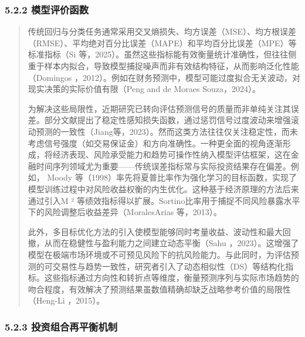 \documentclass[UTF8]{ctexart}
\begin{document}
\subsubsection{5.2.2
模型评价函数}\label{ux6a21ux578bux8bc4ux4ef7ux51fdux6570}

\begin{quote}
传统回归与分类任务通常采用交叉熵损失、均方误差（MSE）、均方根误差（RMSE）、平均绝对百分比误差（MAPE）和平均百分比误差（MPE）等标准指标（Si
等，2025）。虽然这些指标能有效衡量统计准确性，但往往侧重于样本内拟合，导致模型捕捉噪声而非有效结构特征，从而影响泛化性能（Domingos
，2012）。例如在财务预测中，模型可能过度拟合无关波动，对现实决策的实际价值有限（Peng
and de Moraes Souza，2024）。

为解决这些局限性，近期研究已转向评估预测信号的质量而非单纯关注其误差。部分文献提出了稳定性感知损失函数，通过惩罚信号过度波动来增强滚动预测的一致性（Jiang等，2023）。然而这类方法往往仅关注稳定性，而未考虑信号强度（如交易保证金）和方向准确性。一种更全面的视角逐渐形成，将经济表现、风险承受能力和趋势可操作性纳入模型评估框架，这在金融时间序列领域尤为重要------传统误差指标常与实际投资结果存在偏差。例如，
Moody
等（1998）率先将夏普比率作为强化学习的目标函数，实现了模型训练过程中对风险收益权衡的内生优化。这种基于经济原理的方法后来通过引入M
²
等绩效指标得以扩展。Sortino比率用于捕捉不同风险暴露水平下的风险调整后收益差异（MoralesArias
等，2013）。

此外，多目标优化方法的引入使模型能够同时考量收益、波动性和最大回撤，从而在稳健性与盈利能力之间建立动态平衡（Sahu
，2023）。这增强了模型在极端市场环境或不可预见风险下的抗风险能力。与此同时，为评估预测的可交易性与趋势一致性，研究者引入了动态相似性（DS）等结构化指标。这些指标通过方向性和转折点等维度，衡量预测序列与实际市场趋势的吻合程度，有效解决了预测结果虽数值精确却缺乏战略参考价值的局限性（Heng-Li
，2015）。
\end{quote}

\subsubsection{5.2.3
投资组合再平衡机制}\label{ux6295ux8d44ux7ec4ux5408ux518dux5e73ux8861ux673aux5236}
\end{document}
